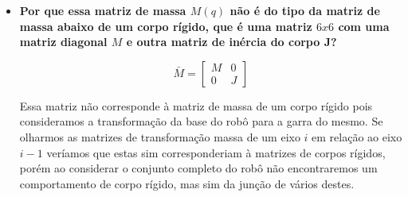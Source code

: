 \documentclass{article}
\begin{document}
\begin{itemize}
	\item \textbf{Por que essa matriz de massa $M(q)$ não é do tipo da matriz de massa abaixo de um corpo rígido, que é uma matriz $6x6$ com uma matriz diagonal $M$ e outra matriz de inércia do corpo J?}
	
	\begin{equation}
	\label{eq:m6x6}
	\bar{M}=\begin{bmatrix}
	M & 0\\
	0 & J
	\end{bmatrix}
	\end{equation}
	
	Essa matriz não corresponde à matriz de massa de um corpo rígido pois consideramos a transformação da base do robô para a garra do mesmo. Se olharmos as matrizes de transformação massa de um eixo $i$ em relação ao eixo $i-1$ veríamos que estas sim corresponderiam à matrizes de corpos rígidos, porém ao considerar o conjunto completo do robô não encontraremos um comportamento de corpo rígido, mas sim da junção de vários destes.
	
\end{itemize}

\begin{thebibliography}{widestlabel}
	
\end{thebibliography}
\end{document}
